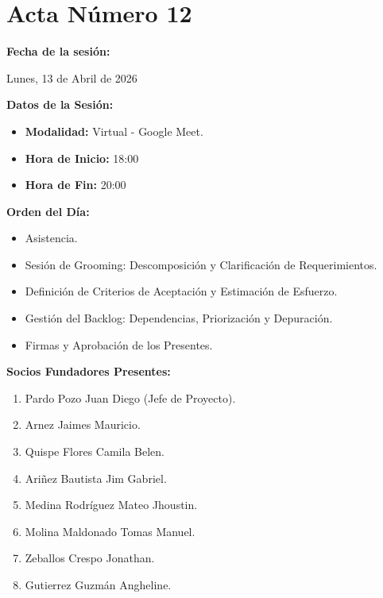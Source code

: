 \newpage
\section{Acta Número 12}
\label{sec:acta12}

\noindent \textbf{Fecha de la sesión:}\par
Lunes, 13 de Abril de 2026

\vspace*{0.5cm}
\noindent \textbf{Datos de la Sesión:}
\vspace{-0.2cm}
\begin{itemize}[noitemsep]
    \item \textbf{Modalidad:} Virtual - Google Meet.
    \item \textbf{Hora de Inicio:} 18:00
    \item \textbf{Hora de Fin:} 20:00
\end{itemize}

\vspace*{0.5cm}
\noindent \textbf{Orden del Día:}
\vspace{-0.2cm}
\begin{itemize}[noitemsep]
    \item Asistencia.
    \item Sesión de Grooming: Descomposición y Clarificación de Requerimientos.
    \item Definición de Criterios de Aceptación y Estimación de Esfuerzo.
    \item Gestión del Backlog: Dependencias, Priorización y Depuración.
    \item Firmas y Aprobación de los Presentes.
\end{itemize}

\vspace*{0.5cm}
\noindent \textbf{Socios Fundadores Presentes:}
\vspace{-0.2cm}
\begin{enumerate}[noitemsep]
    \item Pardo Pozo Juan Diego (Jefe de Proyecto).
    \item Arnez Jaimes Mauricio.
    \item Quispe Flores Camila Belen.
    \item Ariñez Bautista Jim Gabriel.
    \item Medina Rodríguez Mateo Jhoustin.
    \item Molina Maldonado Tomas Manuel.
    \item Zeballos Crespo Jonathan.
    \item Gutierrez Guzmán Angheline.
\end{enumerate}

